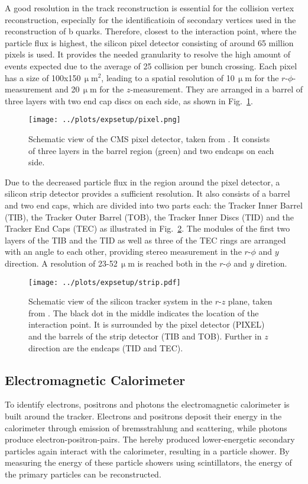 \noindent A good resolution in the track reconstruction is essential for the collision vertex reconstruction, especially for the identificatioin of secondary vertices used in the reconstruction of b quarks. Therefore, closest to the interaction point, where the particle flux is highest, the silicon pixel detector consisting of around 65 million pixels is used. It provides the needed granularity to resolve the high amount of events expected due to the average of 25 collision per bunch crossing. Each pixel has a size of 100x150\,$\upmu$m$^2$, leading to a spatial resolution of 10\,$\upmu$m for the $r$-$\phi$-measurement and 20\,$\upmu$m for the $z$-measurement. They are arranged in a barrel of three layers with two end cap discs on each side, as shown in Fig.~\ref{fig:expsetup:pixel}. 
\begin{figure}
	\centering
	\texttt{[image: ../plots/expsetup/pixel.png]}
	\caption[Schematic view of the CMS pixel detector]{Schematic view of the CMS pixel detector, taken from \cite{CMS_design}. It consists of three layers in the barrel region (green) and two endcaps on each side.}
	\label{fig:expsetup:pixel}
\end{figure}
\noindent Due to the decreased particle flux in the region around the pixel detector, a silicon strip detector provides a sufficient resolution. It also consists of a barrel and two end caps, which are divided into two parts each: the Tracker Inner Barrel (TIB), the Tracker Outer Barrel (TOB), the Tracker Inner Discs (TID) and the Tracker End Caps (TEC) as illustrated in Fig.~\ref{fig:expsetup:strip}. The modules of the first two layers of the TIB and the TID as well as three of the TEC rings are arranged with an angle to each other, providing stereo measurement in the $r$-$\phi$ and $y$ direction. A resolution of 23-52\,$\upmu$m is reached both in the $r$-$\phi$ and $y$ diretion.
\begin{figure}
    \centering
    \texttt{[image: ../plots/expsetup/strip.pdf]}
    \caption[Schematic view of the silicon tracker system]{Schematic view of the silicon tracker system in the $r$-$z$ plane, taken from \cite{strip_fig}. The black dot in the middle indicates the location of the interaction point. It is surrounded by the pixel detector (PIXEL) and the barrels of the strip detector (TIB and TOB). Further in $z$ direction are the endcaps (TID and TEC).}
    \label{fig:expsetup:strip}
\end{figure}

\subsection*{Electromagnetic Calorimeter}
To identify electrons, positrons and photons the electromagnetic calorimeter is built around the tracker. Electrons and positrons deposit their energy in the calorimeter through emission of bremsstrahlung and scattering, while photons produce electron-positron-pairs. The hereby produced lower-energetic secondary particles again interact with the calorimeter, resulting in a particle shower. By measuring the energy of these particle showers using scintillators, the energy of the primary particles can be reconstructed.\\


